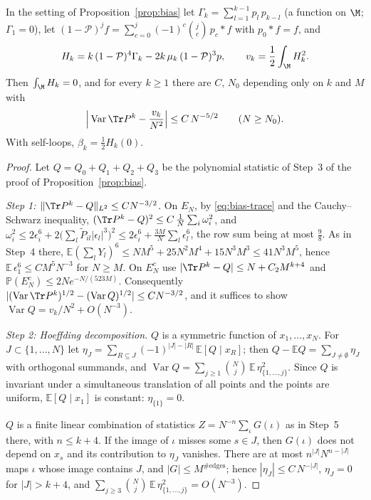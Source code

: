 \begin{proposition}\label{prop:variance}
In the setting of Proposition~\ref{prop:bias} let $\Gamma_k=\sum_{l=1}^{k-1}p_l\,p_{k-l}$ (a function on $\M$; $\Gamma_1=0$), let $(1-\mathcal P)^jf=\sum_{c=0}^j(-1)^c\binom jc\,p_c*f$ with $p_0*f=f$, and
\[
H_k=k\,(1-\mathcal P)^4\Gamma_k-2k\,\mu_k\,(1-\mathcal P)^3p,\qquad v_k=\frac12\int_\M H_k^2 .
\]
Then $\int_\M H_k=0$, and for every $k\ge1$ there are $C$, $N_0$ depending only on $k$ and $M$ with
\[
\Big|\operatorname{Var}\Tr P^k-\frac{v_k}{N^2}\Big|\le C\,N^{-5/2}\qquad(N\ge N_0).
\]
With self-loops, $\beta_k=\frac12H_k(0)$.
\end{proposition}

\begin{proof}
Let $Q=Q_0+Q_1+Q_2+Q_3$ be the polynomial statistic of Step~3 of the proof of Proposition~\ref{prop:bias}.

\emph{Step 1: $\|\Tr P^k-Q\|_{L^2}\le CN^{-3/2}$.} On $E_N$, by \eqref{eq:bias-trace} and the Cauchy--Schwarz inequality, $(\Tr P^k-Q)^2\le C\,\frac1N\sum_i\omega_i^2$, and $\omega_i^2\le2\epsilon_i^6+2\big(\sum_l\tilde P_{il}|\epsilon_l|^3\big)^2\le2\epsilon_i^6+\frac{3M}N\sum_l\epsilon_l^6$, the row sum being at most $\frac98$. As in Step~4 there, $\mathbb E(\sum_lY_l)^6\le NM^5+25N^2M^4+15N^3M^3\le41N^3M^5$, hence $\mathbb E\,\epsilon_1^6\le CM^5N^{-3}$ for $N\ge M$. On $E_N^c$ use $|\Tr P^k-Q|\le N+C_2M^{k+4}$ and $\mathbb P(E_N^c)\le2Ne^{-N/(523M)}$. Consequently $|(\operatorname{Var}\Tr P^k)^{1/2}-(\operatorname{Var}Q)^{1/2}|\le CN^{-3/2}$, and it suffices to show $\operatorname{Var}Q=v_k/N^2+O(N^{-3})$.

\emph{Step 2: Hoeffding decomposition.} $Q$ is a symmetric function of $x_1,\dots,x_N$. For $J\subset\{1,\dots,N\}$ let $\eta_J=\sum_{R\subseteq J}(-1)^{|J|-|R|}\,\mathbb E[Q\mid x_R]$; then $Q-\mathbb EQ=\sum_{J\ne\emptyset}\eta_J$ with orthogonal summands, and $\operatorname{Var}Q=\sum_{j\ge1}\binom Nj\,\mathbb E\,\eta_{\{1,\dots,j\}}^2$. Since $Q$ is invariant under a simultaneous translation of all points and the points are uniform, $\mathbb E[Q\mid x_1]$ is constant: $\eta_{\{1\}}=0$.

$Q$ is a finite linear combination of statistics $Z=N^{-n}\sum_\iota G(\iota)$ as in Step~5 there, with $n\le k+4$. If the image of $\iota$ misses some $s\in J$, then $G(\iota)$ does not depend on $x_s$ and its contribution to $\eta_J$ vanishes. There are at most $n^{|J|}N^{n-|J|}$ maps $\iota$ whose image contains $J$, and $|G|\le M^{\#\mathrm{edges}}$; hence $|\eta_J|\le C\,N^{-|J|}$, $\eta_J=0$ for $|J|>k+4$, and $\sum_{j\ge3}\binom Nj\,\mathbb E\,\eta_{\{1,\dots,j\}}^2=O(N^{-3})$.


\end{proof}
